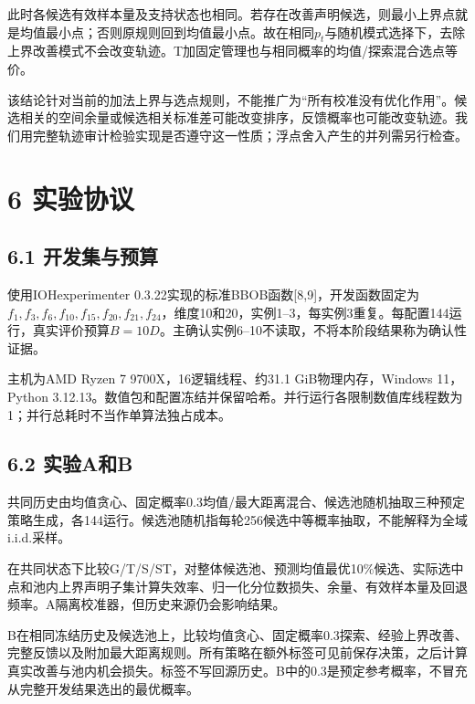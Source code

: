 \documentclass[11pt,a4paper]{article}
\begin{document}
此时各候选有效样本量及支持状态也相同。若存在改善声明候选，则最小上界点就是均值最小点；否则原规则回到均值最小点。故在相同\(p_t\)与随机模式选择下，去除上界改善模式不会改变轨迹。T加固定管理也与相同概率的均值/探索混合选点等价。

该结论针对当前的加法上界与选点规则，不能推广为``所有校准没有优化作用''。候选相关的空间余量或候选相关标准差可能改变排序，反馈概率也可能改变轨迹。我们用完整轨迹审计检验实现是否遵守这一性质；浮点舍入产生的并列需另行检查。

\hypertarget{ux5b9eux9a8cux534fux8bae}{%
\section{6 实验协议}\label{ux5b9eux9a8cux534fux8bae}}

\hypertarget{ux5f00ux53d1ux96c6ux4e0eux9884ux7b97}{%
\subsection{6.1
开发集与预算}\label{ux5f00ux53d1ux96c6ux4e0eux9884ux7b97}}

使用IOHexperimenter
0.3.22实现的标准BBOB函数{[}8,9{]}，开发函数固定为\(f_1,f_3,f_6,f_{10},f_{15},f_{20},f_{21},f_{24}\)，维度10和20，实例1--3，每实例3重复。每配置144运行，真实评价预算\(B=10D\)。主确认实例6--10不读取，不将本阶段结果称为确认性证据。

主机为AMD Ryzen 7 9700X，16逻辑线程、约31.1 GiB物理内存，Windows
11，Python
3.12.13。数值包和配置冻结并保留哈希。并行运行各限制数值库线程数为1；并行总耗时不当作单算法独占成本。

\hypertarget{ux5b9eux9a8caux548cb}{%
\subsection{6.2 实验A和B}\label{ux5b9eux9a8caux548cb}}

共同历史由均值贪心、固定概率0.3均值/最大距离混合、候选池随机抽取三种预定策略生成，各144运行。候选池随机指每轮256候选中等概率抽取，不能解释为全域i.i.d.采样。

在共同状态下比较G/T/S/ST，对整体候选池、预测均值最优10\%候选、实际选中点和池内上界声明子集计算失效率、归一化分位数损失、余量、有效样本量及回退频率。A隔离校准器，但历史来源仍会影响结果。

B在相同冻结历史及候选池上，比较均值贪心、固定概率0.3探索、经验上界改善、完整反馈以及附加最大距离规则。所有策略在额外标签可见前保存决策，之后计算真实改善与池内机会损失。标签不写回源历史。B中的0.3是预定参考概率，不冒充从完整开发结果选出的最优概率。
\end{document}

